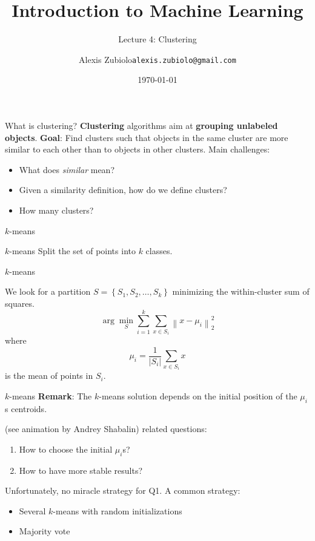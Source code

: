 \documentclass{beamer}
\title[Classification]{Introduction to Machine Learning}
\subtitle{Lecture 4: Clustering}
\author{Alexis Zubiolo\newline\texttt{alexis.zubiolo@gmail.com}}
\institute{Data Science Team Lead @ Adcash}
\date{\today}
\newcommand{\norm}[1]{\left\lVert#1\right\rVert}
\begin{document}
\begin{frame}
  \titlepage
\end{frame}

\begin{frame}{What is clustering?}
\textbf{Clustering} algorithms aim at \textbf{grouping unlabeled objects}.
\vfill
\pause
\textbf{Goal}: Find clusters such that objects in the same cluster are more similar to each other than to objects in other clusters.
\pause
\vfill
Main challenges:
\begin{itemize}
	\item What does \textit{similar} mean?
	\item Given a similarity definition, how do we define clusters?
	\item How many clusters?
\end{itemize}
\end{frame}

\begin{frame}
	\center \Huge{$k$-means}
\end{frame}

\begin{frame}{$k$-means}
Split the set of points into $k$ classes.

\end{frame}

\begin{frame}{$k$-means}

We look for a partition $S = \left\{ S_1, S_2, \dots, S_k\right\}$ minimizing the within-cluster sum of squares.
\begin{equation*}
\arg \min_S \sum_{i = 1}^{k} \sum_{x \in S_i} \norm{x - \mu_i}_2^2
\end{equation*}
where 
\begin{equation*}
\mu_i = \dfrac{1}{|S_i|} \sum_{x \in S_i} x
\end{equation*}
is the mean of points in $S_i$.
\end{frame}

\begin{frame}{$k$-means}
\textbf{Remark}: The $k$-means solution depends on the initial position of the $\mu_i$s centroids.

(see animation by Andrey Shabalin)
\vfill
{} related questions:
\begin{enumerate}
	\item How to choose the initial $\mu_i$s?
	\item How to have more stable results?
\end{enumerate}
\vfill
\pause
Unfortunately, no miracle strategy for Q1. A common strategy:
\begin{itemize}
	\item Several $k$-means with random initializations
	\item Majority vote
\end{itemize}
\end{frame}
\end{document}
